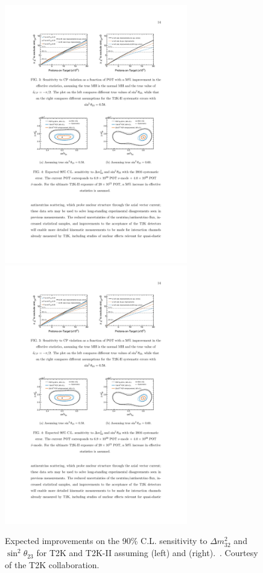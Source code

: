 \begin{figure} [htbp!]
\begin{center}
\includegraphics[width=8cm]{figures/t2kpre_t23dm32_point1_wreactorthrow.pdf}
\includegraphics[width=8cm]{figures/t2kpre_t23dm32_point2_wreactorthrow.pdf}
\caption{\label{fig:t2k2th23} Expected improvements on the 90\% C.L. sensitivity to $\Delta m^2_{32}$ and $\sin^2\theta_{23}$
for T2K and T2K-II assuming  (left) and  (right).~\cite{Abe:2016tez}. Courtesy of the T2K collaboration.}
\end{center}
\end{figure}

